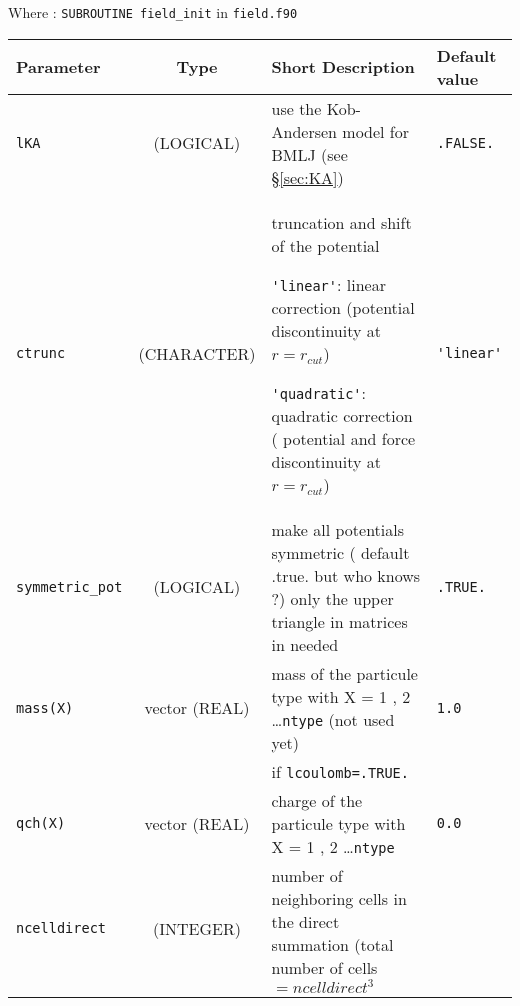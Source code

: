 \documentclass[a4paper]{article}
\begin{document}
Where : \verb?SUBROUTINE field_init? in \verb?field.f90?
\newline

\begin{longtable}{l|c|m{8cm}|m{2cm}}
\hline
\hline
Parameter          &  Type              &          Short Description                                                          & Default value \\
\hline
\hline
\rule[-0.75cm]{0cm}{1.5cm}
\verb?lKA?         &  (LOGICAL)         & use the Kob-Andersen model for BMLJ (see \S \ref{sec:KA})                           & \verb?.FALSE.? \\
\hline
\rule[-0.75cm]{0cm}{1.5cm}
\verb?ctrunc?      &  (CHARACTER)       & \newline truncation and shift of the potential \newline 

                                         \verb?'linear'?: linear correction (potential discontinuity at $r=r_{cut}$) \newline 
					 
                   			 \verb?'quadratic'?: quadratic correction ( potential and force 
					 discontinuity at $r=r_{cut}$) \newline                                               & \verb?'linear'? \tabularnewline
\hline
\rule[-0.75cm]{0cm}{1.5cm}
\verb?symmetric_pot? & (LOGICAL)        &  make all potentials symmetric ( default .true. but who knows ?) \newline  
	                                   only the upper triangle in matrices in needed                                     & \verb?.TRUE.? \tabularnewline
\hline
\rule[-0.75cm]{0cm}{1.5cm}
\verb?mass(X)?        &  vector (REAL)         & mass of the particule type with X = 1 , 2 \ldots \verb?ntype? (not used yet)        & \verb?1.0? \\
\hline
\hline
\rule[-0.75cm]{0cm}{1.5cm}
 &  & if \verb?lcoulomb=.TRUE.? & \\
\hline
\rule[-0.75cm]{0cm}{1.5cm}
\verb?qch(X)?          &  vector (REAL)        & charge of the particule type with X = 1 , 2 \ldots \verb?ntype?                     & \verb?0.0?\\
\hline
\rule[-0.75cm]{0cm}{1.5cm}
\verb?ncelldirect? &  (INTEGER)        & \newline number of neighboring cells in the direct summation 
                                         (total number of cells $=ncelldirect^3$ \newline 


\end{longtable}
\end{document}

